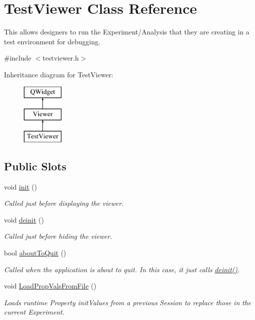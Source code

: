 \hypertarget{class_test_viewer}{\section{Test\-Viewer Class Reference}
\label{class_test_viewer}
}


This allows designers to run the Experiment/\-Analysis that they are creating in a test environment for debugging.  




{\ttfamily \#include $<$testviewer.\-h$>$}

Inheritance diagram for Test\-Viewer\-:\begin{figure}[H]
\begin{center}
\leavevmode
\includegraphics[height=3.000000cm]{class_test_viewer}
\end{center}
\end{figure}
\subsection*{Public Slots}
\begin{DoxyCompactItemize}
\item 
void \hyperlink{class_test_viewer_a33fb46c0d10ef281c24697687f3b3ea3}{init} ()
\begin{DoxyCompactList}\small\item\em Called just before displaying the viewer. \end{DoxyCompactList}\item 
void \hyperlink{class_test_viewer_aa585afc2e81af645c57e31d2fe8e4d9f}{deinit} ()
\begin{DoxyCompactList}\small\item\em Called just before hiding the viewer. \end{DoxyCompactList}\item 
\hypertarget{class_test_viewer_a44961fb27651b9cfaa7b3fa147832ca8}{bool \hyperlink{class_test_viewer_a44961fb27651b9cfaa7b3fa147832ca8}{about\-To\-Quit} ()}\label{class_test_viewer_a44961fb27651b9cfaa7b3fa147832ca8}

\begin{DoxyCompactList}\small\item\em Called when the application is about to quit. In this case, it just calls \hyperlink{class_test_viewer_aa585afc2e81af645c57e31d2fe8e4d9f}{deinit()}. \end{DoxyCompactList}\item 
void \hyperlink{class_test_viewer_a8ff7fc29e9eb7473a8f6f2994ed7ea1d}{Load\-Prop\-Vals\-From\-File} ()
\begin{DoxyCompactList}\small\item\em Loads runtime Property init\-Values from a previous Session to replace those in the current Experiment. \end{DoxyCompactList}\end{DoxyCompactItemize}

